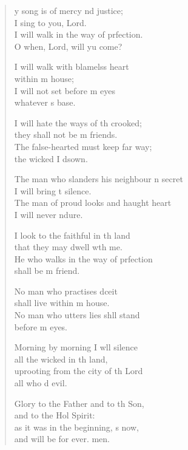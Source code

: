 \settowidth{\versewidth}{The man who slanders his neighbor in secret *}
\begin{verse}%
  \begin{patverse}
y song is of mercy nd justice;\Med\\
I sing to you,  Lord.\\
I will walk in the way of prfection.\Med\\
O when, Lord, will yu come?

I will walk with blamelss heart\Med\\
within m house;\\
I will not set before m eyes\Med\\
whatever \pointup{\i}s base.

I will hate the ways of th crooked;\Med\\
they shall not be m friends.\\
The false-hearted must keep far way;\Med\\
the wicked I d\pointup{\i}sown.

The man who slanders his neighbour \pointup{\i}n secret\Med\\
I will bring t silence.\\
The man of proud looks and haught heart\Med\\
I will never ndure.

I look to the faithful in th land\Med\\
that they may dwell w\pointup{\i}th me.\\
He who walks in the way of prfection\Med\\
shall be m friend.

No man who practises dceit\Med\\
shall live within m house.\\
No man who utters lies shll stand\Med\\
before m eyes.

Morning by morning I w\pointup{\i}ll silence\Med\\
all the wicked in th land,\\
uprooting from the city of th Lord\Med\\
all who d evil.

Glory to the Father and to th Son,\Med\\
and to the Hol Spirit:\\
as it was in the beginning, \pointup{\i}s now,\Med\\
and will be for ever. men.
  \end{patverse}
\end{verse}
\setlength{\leftmargini}{\defleftmargini}  %
